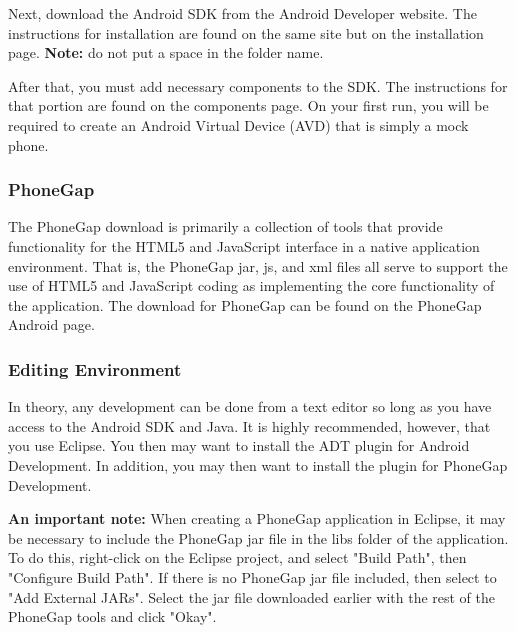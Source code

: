 \documentclass[12pt]{article}
\begin{document}
\begin{itemize}
Next, download the Android SDK from the Android Developer website\cite{AndroidSDK-Download}.
The instructions for installation are found on the same site but on the installation page\cite{AndroidSDK-Installation}. \textbf{Note:} do not put a space in the folder name.

After that, you must add necessary components to the SDK.  The instructions for that portion are found on the components page\cite{AndroidSDK-Components}.  On your first run, you will be required to create an Android Virtual Device (AVD) that is simply a mock phone.


\subsubsection{PhoneGap}
The PhoneGap download is primarily a collection of tools that provide functionality for the HTML5 and JavaScript interface in a native application environment.  That is, the PhoneGap jar, js, and xml files all serve to support the use of HTML5 and JavaScript coding as implementing the core functionality of the application.  The download for PhoneGap can be found on the PhoneGap Android page\cite{PhoneGap-Android}.


\subsubsection{Editing Environment}
In theory, any development can be done from a text editor so long as you have access to the Android SDK and Java.  It is highly recommended, however, that you use Eclipse\cite{Eclipse-Helios}.  You then may want to install the ADT plugin for Android Development\cite{Eclipse-ADT}.  In addition, you may then want to install the plugin for PhoneGap Development\cite{PhoneGap-Eclipse}.

\textbf{An important note:} When creating a PhoneGap application in Eclipse, it may be necessary to include the PhoneGap jar file in the libs folder of the application.  To do this, right-click on the Eclipse project, and select "Build Path", then "Configure Build Path".  If there is no PhoneGap jar file included, then select to "Add External JARs".  Select the jar file downloaded earlier with the rest of the PhoneGap tools and click "Okay".


\end{itemize}
\end{document}
